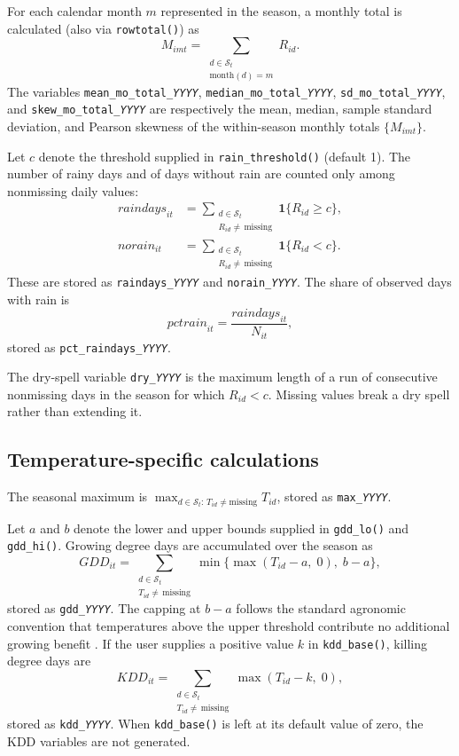 For each calendar month $m$ represented in the season, a monthly total is calculated (also via \texttt{rowtotal()}) as
\[
M_{imt} = \sum_{\substack{d\in\mathcal{S}_{t} \\ \text{month}(d)=m}} R_{id}.
\]
The variables \texttt{mean\_mo\_total\_\textit{YYYY}}, \texttt{median\_mo\_total\_\textit{YYYY}}, \texttt{sd\_mo\_total\_\textit{YYYY}}, and \texttt{skew\_mo\_total\_\textit{YYYY}} are respectively the mean, median, sample standard deviation, and Pearson skewness of the within-season monthly totals $\{M_{imt}\}$.

Let $c$ denote the threshold supplied in \texttt{rain\_threshold()} (default 1). The number of rainy days and of days without rain are counted only among nonmissing daily values:
\begin{align}
\textit{raindays}_{it} &= \sum_{\substack{d\in\mathcal{S}_{t} \\ R_{id}\neq\,\text{missing}}} \mathbf{1}\{R_{id}\geq c\}, \\[4pt]
\textit{norain}_{it} &= \sum_{\substack{d\in\mathcal{S}_{t} \\ R_{id}\neq\,\text{missing}}} \mathbf{1}\{R_{id}< c\}.
\end{align}
These are stored as \texttt{raindays\_\textit{YYYY}} and \texttt{norain\_\textit{YYYY}}. The share of observed days with rain is
\[
\textit{pctrain}_{it} = \frac{\textit{raindays}_{it}}{N_{it}},
\]
stored as \texttt{pct\_raindays\_\textit{YYYY}}.

The dry-spell variable \texttt{dry\_\textit{YYYY}} is the maximum length of a run of consecutive nonmissing days in the season for which $R_{id}<c$. Missing values break a dry spell rather than extending it.

\subsection{Temperature-specific calculations}

The seasonal maximum is $\max_{d\in\mathcal{S}_t:\,T_{id}\neq\text{missing}} T_{id}$, stored as \texttt{max\_\textit{YYYY}}.

Let $a$ and $b$ denote the lower and upper bounds supplied in \texttt{gdd\_lo()} and \texttt{gdd\_hi()}. Growing degree days are accumulated over the season as
\[
\textit{GDD}_{it} = \sum_{\substack{d\in\mathcal{S}_{t} \\ T_{id}\neq\,\text{missing}}} \min\bigl\{\max(T_{id}-a,\;0),\;b-a\bigr\},
\]
stored as \texttt{gdd\_\textit{YYYY}}. The capping at $b-a$ follows the standard agronomic convention that temperatures above the upper threshold contribute no additional growing benefit \citep{DescheneGreenstone07}. If the user supplies a positive value $k$ in \texttt{kdd\_base()}, killing degree days are
\[
\textit{KDD}_{it} = \sum_{\substack{d\in\mathcal{S}_{t} \\ T_{id}\neq\,\text{missing}}} \max(T_{id}-k,\;0),
\]
stored as \texttt{kdd\_\textit{YYYY}}. When \texttt{kdd\_base()} is left at its default value of zero, the KDD variables are not generated.


